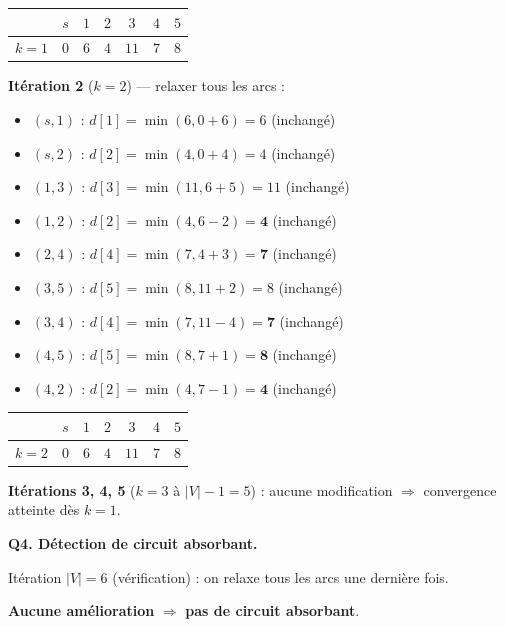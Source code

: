 \documentclass[12pt,a4paper]{article}
\begin{document}
\begin{correction}
\begin{center}
\begin{tabular}{|c|c|c|c|c|c|c|}
\hline
& $s$ & $1$ & $2$ & $3$ & $4$ & $5$ \\\hline
$k=1$ & $0$ & $6$ & $4$ & $11$ & $7$ & $8$ \\\hline
\end{tabular}
\end{center}

\textbf{It\'eration 2} ($k=2$) --- relaxer tous les arcs :
\begin{itemize}[nosep]
    \item $(s,1)$ : $d[1] = \min(6, 0+6) = 6$ (inchang\'e)
    \item $(s,2)$ : $d[2] = \min(4, 0+4) = 4$ (inchang\'e)
    \item $(1,3)$ : $d[3] = \min(11, 6+5) = 11$ (inchang\'e)
    \item $(1,2)$ : $d[2] = \min(4, 6-2) = \mathbf{4}$ (inchang\'e)
    \item $(2,4)$ : $d[4] = \min(7, 4+3) = \mathbf{7}$ (inchang\'e)
    \item $(3,5)$ : $d[5] = \min(8, 11+2) = 8$ (inchang\'e)
    \item $(3,4)$ : $d[4] = \min(7, 11-4) = \mathbf{7}$ (inchang\'e)
    \item $(4,5)$ : $d[5] = \min(8, 7+1) = \mathbf{8}$ (inchang\'e)
    \item $(4,2)$ : $d[2] = \min(4, 7-1) = \mathbf{4}$ (inchang\'e)
\end{itemize}

\begin{center}
\begin{tabular}{|c|c|c|c|c|c|c|}
\hline
& $s$ & $1$ & $2$ & $3$ & $4$ & $5$ \\\hline
$k=2$ & $0$ & $6$ & $4$ & $11$ & $7$ & $8$ \\\hline
\end{tabular}
\end{center}

\textbf{It\'erations 3, 4, 5} ($k=3$ \`a $|V|-1=5$) : aucune modification $\Rightarrow$ convergence atteinte d\`es $k=1$.

\medskip
\textbf{Q4. D\'etection de circuit absorbant.}

It\'eration $|V| = 6$ (v\'erification) : on relaxe tous les arcs une derni\`ere fois.

\textbf{Aucune am\'elioration} $\Rightarrow$ \textcolor{defvert}{\textbf{pas de circuit absorbant}}.


\end{correction}
\end{document}
